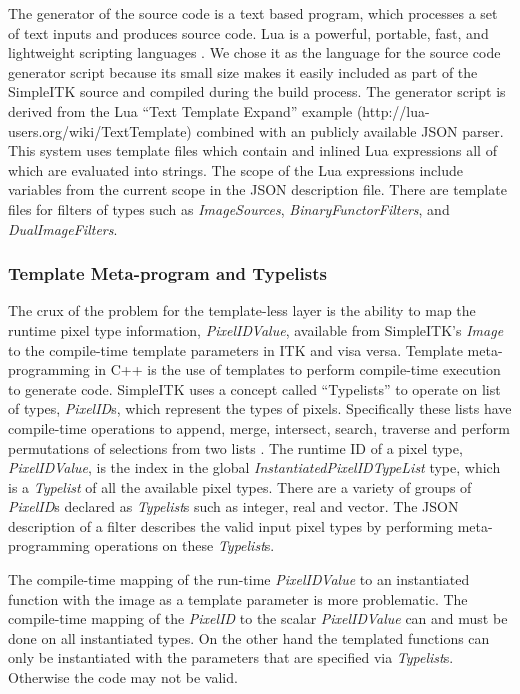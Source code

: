 \documentclass{frontiersMED} %
\begin{document}
The generator of the source code is a text based program, which
processes a set of text inputs and produces source code. Lua is a
powerful, portable, fast, and lightweight scripting languages
\cite{Ierusalimschy2006}. We chose it as the language for the source code
generator script because its small size makes it easily included as
part of the SimpleITK source and compiled during the build
process. The generator script is derived from the Lua ``Text Template
Expand'' example (http://lua-users.org/wiki/TextTemplate) combined
with an publicly available JSON  parser. This system uses template
files which contain and inlined Lua expressions all of which are
evaluated into strings. The scope of the Lua expressions include
variables from the current scope in the JSON description file. There
are template files for filters of types such as \textit{ImageSources},
\textit{BinaryFunctorFilters}, and \textit{DualImageFilters}.

\subsubsection{Template Meta-program and Typelists}
The crux of the problem for the template-less layer is the ability to
map the runtime pixel type information, \textit{PixelIDValue}, available from
SimpleITK's \textit{Image} to the compile-time template parameters in ITK and
visa versa. Template meta-programming in C++ is the use of templates
to perform compile-time execution to generate code. SimpleITK uses a
concept called ``Typelists'' to operate on list of types, \textit{PixelID}s,
which represent the types of pixels. Specifically these lists have
compile-time operations to append, merge, intersect, search, traverse
and perform permutations of selections from two lists
\cite{Alexandrescu2001}. The runtime ID of a pixel type, \textit{PixelIDValue}, is
the index in the global \textit{InstantiatedPixelIDTypeList} type, which is a
\textit{Typelist} of all the available pixel types. There are a variety of
groups of \textit{PixelID}s declared as \textit{Typelist}s such as integer, real and
vector. The JSON description of a filter describes the valid input
pixel types by performing meta-programming operations on these
\textit{Typelist}s.

The compile-time mapping of the run-time \textit{PixelIDValue} to an
instantiated function with the image as a template parameter is more
problematic. The compile-time mapping of the \textit{PixelID} to the scalar
\textit{PixelIDValue} can and must be done on all instantiated types. On the
other hand the templated functions can only be instantiated with the
parameters that are specified via \textit{Typelist}s. Otherwise the code may
not be valid.
\end{document}
